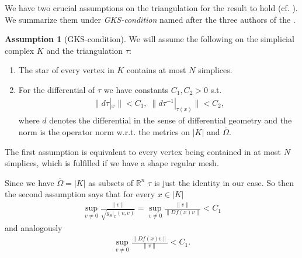\documentclass[12pt,a4paper]{article}
\theoremstyle{definition}
\newtheorem{assumption}{Assumption}
\newcommand{\omegabar}{\overline{\Omega}}
\newcommand{\real}{\mathbb{R}}
\begin{document}
We have two crucial assumptions on the triangulation for the result to hold 
(cf. \cite[p.194]{goldshtein}). We summarize them under 
\textit{GKS-condition} named after the three authors of the \cite{goldshtein}.

\begin{assumption}[GKS-condition]
    We will assume the following on the simplicial complex $K$ 
    and the triangulation $\tau$:
    \begin{enumerate}
    \item The star of every vertex in $K$ contains at most $N$ simplices.
    \item For the differential of $\tau$ we have constants 
        $C_1, C_2 > 0$ s.t.
        \begin{align*}
        \lVert d\tau|_x \rVert < C_1, \; 
        \lVert d\tau^{-1}|_{\tau(x)} \rVert < C_2,
        \end{align*}
        where $d$ denotes the differential in the sense of differential 
        geometry and the norm is the operator norm w.r.t. the metrics on $|K|$ 
        and $\omegabar$.
    \end{enumerate}
\end{assumption}
The first assumption is equivalent to every vertex being contained in
at most $N$ simplices, which is fulfilled if we have a shape regular mesh.\par

Since we have $\omegabar = |K|$ as subsets of $\real^n$ $\tau$ is just the 
identity in our case. So then the second assumption says that for every 
$x \in |K|$
\begin{align*}
\sup\limits_{v \neq 0} \frac{\lVert v \rVert}{\sqrt{g_S|_x(v,v)}} =
\sup\limits_{v \neq 0} \frac{\lVert v \rVert}{\lVert Df(x)v\rVert} < C_1
\end{align*}
and analogously
\begin{align*}
    \sup\limits_{v \neq 0} \frac{\lVert Df(x)v\rVert}{\lVert v \rVert} < C_1.
\end{align*}

\end{document}
